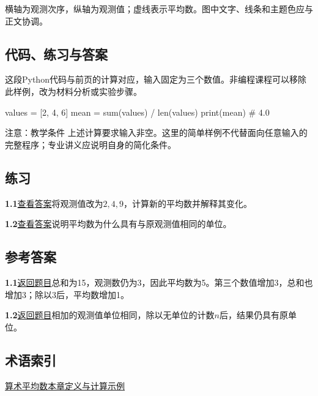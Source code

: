 \documentclass[UTF8,fontset=none,zihao=-4,a4paper]{ctexart}
\newcommand{\termref}[2]{\hyperlink{term:#1}{#2}}
\newcommand{\exercise}[2]{\hypertarget{exercise:#1}{\textbf{#2}}\quad\hyperlink{answer:#1}{\small 查看答案}\quad}
\newcommand{\answer}[2]{\hypertarget{answer:#1}{\textbf{#2}}\quad\hyperlink{exercise:#1}{\small 返回题目}\quad}
\numberwithin{equation}{section}
\begin{document}
\begin{center}
\end{center}
横轴为观测次序，纵轴为观测值；虚线表示平均数。图中文字、线条和主题色应与正文协调。

\newpage
\subsection{代码、练习与答案}
这段Python代码与前页的计算对应，输入固定为三个数值。非编程课程可以移除此样例，改为材料分析或实验步骤。
\begin{codeblock}
values = [2, 4, 6]
mean = sum(values) / len(values)
print(mean)  # 4.0
\end{codeblock}
\begin{infobox}{注意：教学条件}
上述计算要求输入非空。这里的简单样例不代替面向任意输入的完整程序；专业讲义应说明自身的简化条件。
\end{infobox}
\subsection{练习}
\par\noindent\exercise{mean-1}{1.1}将观测值改为$2,4,9$，计算新的平均数并解释其变化。
\par\noindent\exercise{mean-2}{1.2}说明平均数为什么具有与原观测值相同的单位。
\subsection{参考答案}
\par\noindent\answer{mean-1}{1.1}总和为15，观测数仍为3，因此平均数为5。第三个数值增加3，总和也增加3；除以3后，平均数增加1。

\par\noindent\answer{mean-2}{1.2}相加的观测值单位相同，除以无单位的计数$n$后，结果仍具有原单位。
\subsection{术语索引}
\noindent\termref{mean}{算术平均数}\quad\hyperref[ch:sample]{本章定义与计算示例}
\end{document}
